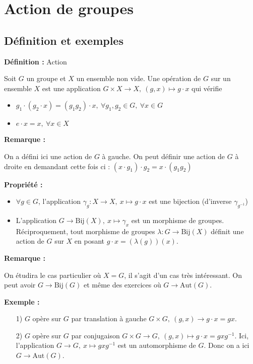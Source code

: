 \documentclass{report}
\newenvironment{definition}[1][]{
    \begin{tcolorbox}[colframe= white]
    \textbf{Définition :} 
    #1 \par
    }
    {\end{tcolorbox}}
\newenvironment{prop}{\begin{tcolorbox}[colframe= white]
    \textbf{Propriété :}
     \par}
    {\end{tcolorbox}}
\newenvironment{exemple}{\begin{tcolorbox}[colback=gray!10,colframe= white]
    \textbf{Exemple :}
     \par}
    {\end{tcolorbox}}
\newcommand{\remarque}{
    \noindent\textbf{Remarque :} \par
}
\begin{document}
\chapter{Action de groupes}

\section{Définition et exemples}
\par
\begin{definition}[Action] Soit $G$ un groupe et $X$ un ensemble non vide. Une opération de $G$ sur un ensemble $X$ est une application $G\times X\longrightarrow  X,\ (g,x)\mapsto  g\cdot x$
qui vérifie
\begin{itemize}
\item $g_1\cdot(g_2\cdot x)=(g_1g_2)\cdot x,\ \forall g_1,g_2\in G,\ \forall x\in G$
\item $e\cdot x=x,\ \forall x\in X$
\end{itemize}
\end{definition}
\par
\remarque{On a défini ici une action de $G$ à gauche. On peut définir une action de $G$ à droite en demandant cette fois ci : $(x\cdot g_1)\cdot g_2=x\cdot (g_1g_2)$}
\par
\begin{prop}
\begin{itemize}
\item $\forall g\in G$, l'application $\gamma_g:X\longrightarrow  X,\ x\mapsto  g\cdot x$ est une bijection (d'inverse $\gamma_{g^{-1}}$)
\item L'application $G\longrightarrow \text{Bij}(X),\ x\mapsto  \gamma_x$ est un morphisme de groupes. Réciproquement, tout morphisme de groupes $\lambda:G\longrightarrow  \text{Bij}(X)$ définit une action de $G$ sur $X$ en posant $g\cdot x=(\lambda(g))(x)$.
\end{itemize}
\end{prop}
\par
\remarque{On étudira le cas particulier où $X=G$, il s'agit d'un cas très intéressant. On peut avoir $G\longrightarrow \text{Bij}(G)$ et même des exercices où $G\longrightarrow \text{Aut}(G)$.}
\par
\begin{exemple}
\begin{itemize}
\item[1)] $G$ opère sur $G$ par translation à gauche $G\times G,\ (g,x)\longrightarrow  g\cdot x=gx$. 
\item[2)] $G$ opère sur $G$ par conjugaison  $G\times G\longrightarrow  G,\ (g,x)\mapsto  g\cdot x=gxg^{-1}$. Ici, l'application $G\longrightarrow  G,\ x\mapsto  gxg^{-1}$ est un automorphisme de $G$. Donc on a ici $G\longrightarrow  \text{Aut}(G)$. 
\end{itemize}
\end{exemple}
\end{document}
